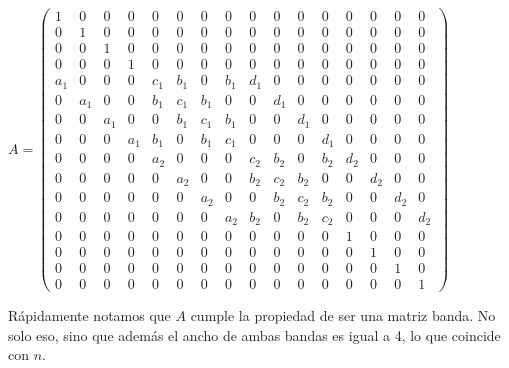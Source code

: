 \setcounter{MaxMatrixCols}{16}
\begin{center}
$ A =
\begin{pmatrix}
	1	 	& 0 		& 0 		& 	0	 	& 0	 	& 0 		& 0	 	& 	0 		& 0		& 0 		& 0 		& 	0	  & 0		& 0	 	& 0 		& 	0\\
	0	 	& 1 		& 0 		& 	0	 	& 0 		& 0		& 0	 	& 	0 		& 0 		& 0 		& 0 		& 	0	  & 0 		& 0	 	& 0 		& 	0\\
	0	 	& 0 		& 1 		& 	0	 	& 0 		& 0 		& 0	 	& 	0 		& 0 		& 0 		& 0 		& 	0	  & 0 		& 0	 	& 0 		& 	0\\
	0 		& 0 		& 0 		& 1	 	& 0 		& 0 		& 0	 	& 	0 		& 0 		& 0 		& 0 		& 	0	  & 0 		& 0	 	& 0 		& 	0\\
	a_1 & 0 		& 0		& 0	 	& c_1 	& b_1 & 0		& b_1 & d_1 	& 0 		& 0 		& 	0	  & 0 		& 0	 	& 0 		& 	0\\
	0 		& a_1	& 0		& 0	 	& b_1 	& c_1 & b_1 	& 0 		& 0 		& d_1 	& 0 		& 	0	  & 0 		& 0	 	& 0 		& 	0\\
	0 		& 	0		& a_1	& 0	 	& 0		& b_1 	& c_1 & b_1 	& 0 		& 0 		& d_1 	& 0 	  & 0		& 0 	 	& 0		& 0\\
	0	 	& 0 		& 0 		& a_1	& b_1	& 0 		& b_1 	& c_1	& 0		& 0 		& 0 		& d_1 & 0 		& 0	 	& 0 		& 	0\\
	0 		& 0	 	& 0 		& 	0		&	a_2 & 0 		& 0		& 0	 	& c_2 	& b_2 & 0		& b_2 & d_2 	& 0 		& 0 		& 	0\\
	0 		& 	0	  & 0 		& 0	 	& 0 		& a_2	& 0		& 0	 	& b_2 	& c_2 & b_2 	& 0 		& 0 		& d_2 	& 0		& 0\\
	0 		& 	0		& 0 	 	& 0		& 0		& 0 		& a_2	& 0	 	& 0		& b_2 	& c_2 & b_2 	& 0 		& 0 		& d_2 	& 0\\ 	 
	0	 	& 0 		& 0 		& 0 		& 0	 	& 0 		& 	0		& a_2	& b_2	& 0 		& b_2 	& c_2	& 0		& 0 		& 0 		& d_2\\
	0	 	& 0 		& 0 		& 	0	 	& 0	 	& 0 		& 0	 	& 	0 		& 0		& 0 		& 0 		& 	0	  & 1		& 0	 	& 0 		& 	0\\
	0	 	& 0 		& 0 		& 	0	 	& 0 		& 0		& 0	 	& 	0 		& 0 		& 0 		& 0 		& 	0	  & 0 		& 1	 	& 0 		& 	0\\
	0	 	& 0 		& 0 		& 	0	 	& 0 		& 0 		& 0	 	& 	0 		& 0 		& 0 		& 0 		& 	0	  & 0 		& 0	 	& 1 		& 	0\\
	0 		& 0 		& 0 		& 0	 	& 0 		& 0 		& 0	 	& 	0 		& 0 		& 0 		& 0 		& 	0	  & 0 		& 0	 	& 0 		& 	1
\end{pmatrix} 
$
\end{center}

Rápidamente notamos que $A$ cumple la propiedad de ser una matriz banda. No solo eso, sino que además el ancho de ambas bandas es igual a 4, lo que coincide con $n$.

